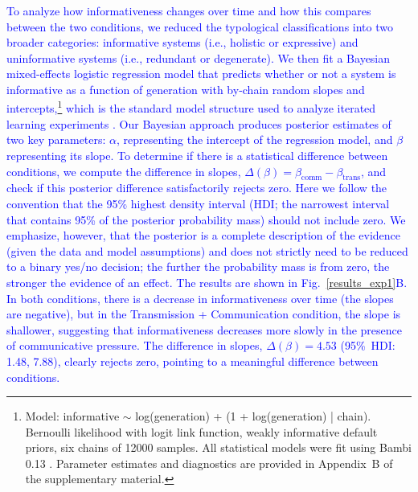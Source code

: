 \documentclass[doc,biblatex]{apa7}
\newcommand\newmaterial[1]{\textcolor{blue}{#1}}
\begin{document}
\newmaterial{To analyze how informativeness changes over time and how this compares between the two conditions, we reduced the typological classifications into two broader categories: informative systems (i.e., holistic or expressive) and uninformative systems (i.e., redundant or degenerate). We then fit a Bayesian mixed-effects logistic regression model that predicts whether or not a system is informative as a function of generation with by-chain random slopes and intercepts,\footnote{Model: informative $\sim$ log(generation) + (1 + log(generation) | chain). Bernoulli likelihood with logit link function, weakly informative default priors, six chains of 12000 samples. All statistical models were fit using Bambi 0.13 \parencite{Capretto:2022}. Parameter estimates and diagnostics are provided in Appendix~B of the supplementary material.} which is the standard model structure used to analyze iterated learning experiments \parencite{Winter:2016}. Our Bayesian approach produces posterior estimates of two key parameters: $\alpha$, representing the intercept of the regression model, and $\beta$ representing its slope. To determine if there is a statistical difference between conditions, we compute the difference in slopes, $\Delta(\beta) = \beta_\mathrm{comm} - \beta_\mathrm{trans}$, and check if this posterior difference satisfactorily rejects zero. Here we follow the convention that the 95\% highest density interval (HDI; the narrowest interval that contains 95\% of the posterior probability mass) should not include zero. We emphasize, however, that the posterior is a complete description of the evidence (given the data and model assumptions) and does not strictly need to be reduced to a binary yes/no decision; the further the probability mass is from zero, the stronger the evidence of an effect. The results are shown in Fig.~\ref{results_exp1}B. In both conditions, there is a decrease in informativeness over time (the slopes are negative), but in the Transmission + Communication condition, the slope is shallower, suggesting that informativeness decreases more slowly in the presence of communicative pressure. The difference in slopes, $\Delta(\beta) = 4.53$ (95\%~HDI: 1.48, 7.88), clearly rejects zero, pointing to a meaningful difference between conditions.}
\end{document}
